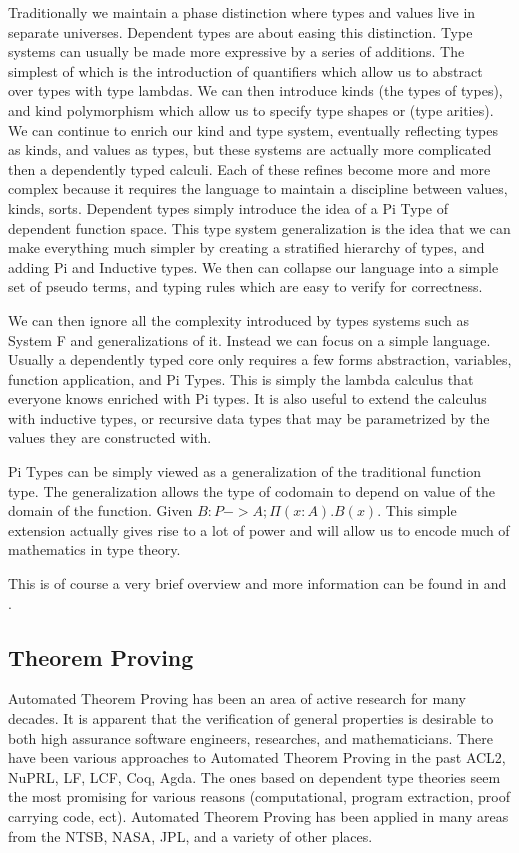 \documentclass[12pt, titlepage]{article}
\begin{document}
Traditionally we maintain a phase distinction where types and values live in separate universes. Dependent types
are about easing this distinction. Type systems can usually be made more expressive by a series of additions.
The simplest of which is the introduction of quantifiers which allow us to abstract over types with type lambdas. 
We can then introduce kinds (the types of types), and kind polymorphism which allow us to specify type shapes or (type arities).
We can continue to enrich our kind and type system, eventually reflecting types as kinds, and values as types, 
but these systems are actually more complicated then a dependently typed calculi. Each of these refines become
more and more complex because it requires the language to maintain a discipline between values, kinds, sorts.
Dependent types simply introduce the idea of a Pi Type of dependent function space. This type system generalization is the 
idea that we can make everything much simpler by creating a stratified hierarchy of types, and adding Pi and Inductive types.
We then can collapse our language into a simple set of pseudo terms, and typing rules which are easy to verify for correctness.

We can then ignore all the complexity introduced by types systems such as System F and generalizations of it. Instead we can 
focus on a simple language. Usually a dependently typed core only requires a few forms abstraction, variables, function application,
and Pi Types. This is simply the lambda calculus that everyone knows enriched with Pi types. It is also useful to extend the calculus
with inductive types, or recursive data types that may be parametrized by the values they are constructed with.

Pi Types can be simply viewed as a generalization of the traditional function type. The generalization
allows the type of codomain to depend on value of the domain of the function. Given $B : P -> A; \Pi (x : A). B(x)$. This
simple extension actually gives rise to a lot of power and will allow us to encode much of mathematics in type theory.

This is of course a very brief overview and more information can be found in \cite{Pierce:TypeSystems} \cite{martinlof} and \cite{HoTTbook}.

\subsection{Theorem Proving}

Automated Theorem Proving has been an area of active research for many decades. It is apparent that the
verification of general properties is desirable to both high assurance software engineers, researches, and
mathematicians. There have been various approaches to Automated Theorem Proving in the past ACL2, NuPRL, LF,
LCF, Coq, Agda. The ones based on dependent type theories seem the most promising for various reasons 
(computational, program extraction, proof carrying code, ect). Automated Theorem Proving has been applied in
many areas from the NTSB, NASA, JPL, and a variety of other places.
\end{document}
